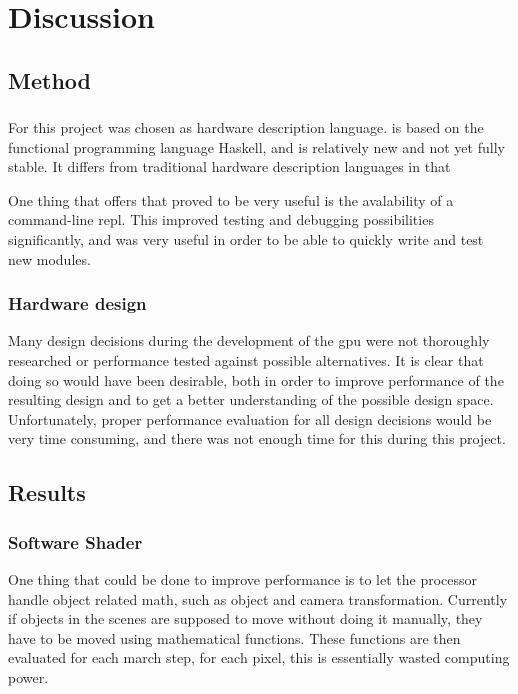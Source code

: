 \chapter{Discussion}
	
	\section{Method}
		
		\subsection{\clash}

			For this project \clash was chosen as hardware description language.
			\clash is based on the functional programming language Haskell, and
			is relatively new and not yet fully stable. It differs from 
			traditional hardware description languages in that 

			One thing that \clash offers that proved to be very useful is the 
			avalability of a command-line repl. This improved testing and 
			debugging possibilities significantly, and was very useful in order
			to be able to quickly write and test new modules.

		\subsection{Hardware design}

			Many design decisions during the development of the gpu were not
			thoroughly researched or performance tested against possible
			alternatives. It is clear that doing so would have been desirable,
			both in order to improve performance of the resulting design and to
			get a better understanding of the possible design space. 
			Unfortunately, proper performance evaluation for all design 
			decisions would be very time consuming, and there was not enough 
			time for this during this project.

	\section{Results}
		
		\subsection{Software Shader}
		
			One thing that could be done to improve performance is to let the
			processor handle object related math, such as object and camera 
			transformation. Currently if objects in the scenes are supposed to 
			move without doing it manually, they have to be moved using 
			mathematical functions. These functions are then evaluated for 
			each march step, for each pixel, this is essentially wasted 
			computing power.

